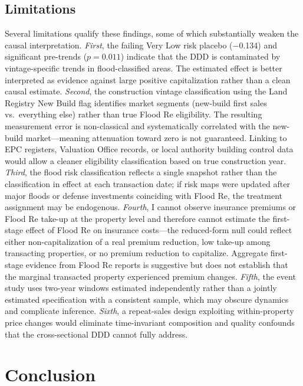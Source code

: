 \documentclass[12pt]{article}
\begin{document}
\subsection{Limitations}

Several limitations qualify these findings, some of which substantially weaken the causal interpretation. \textit{First}, the failing Very Low risk placebo ($-$0.134) and significant pre-trends ($p = 0.011$) indicate that the DDD is contaminated by vintage-specific trends in flood-classified areas. The estimated effect is better interpreted as evidence against large positive capitalization rather than a clean causal estimate. \textit{Second}, the construction vintage classification using the Land Registry New Build flag identifies market segments (new-build first sales vs.\ everything else) rather than true Flood Re eligibility. The resulting measurement error is non-classical and systematically correlated with the new-build market---meaning attenuation toward zero is not guaranteed. Linking to EPC registers, Valuation Office records, or local authority building control data would allow a cleaner eligibility classification based on true construction year. \textit{Third}, the flood risk classification reflects a single snapshot rather than the classification in effect at each transaction date; if risk maps were updated after major floods or defense investments coinciding with Flood Re, the treatment assignment may be endogenous. \textit{Fourth}, I cannot observe insurance premiums or Flood Re take-up at the property level and therefore cannot estimate the first-stage effect of Flood Re on insurance costs---the reduced-form null could reflect either non-capitalization of a real premium reduction, low take-up among transacting properties, or no premium reduction to capitalize. Aggregate first-stage evidence from Flood Re reports is suggestive but does not establish that the marginal transacted property experienced premium changes. \textit{Fifth}, the event study uses two-year windows estimated independently rather than a jointly estimated specification with a consistent sample, which may obscure dynamics and complicate inference. \textit{Sixth}, a repeat-sales design exploiting within-property price changes would eliminate time-invariant composition and quality confounds that the cross-sectional DDD cannot fully address.


\section{Conclusion}
\label{sec:conclusion}
\end{document}
